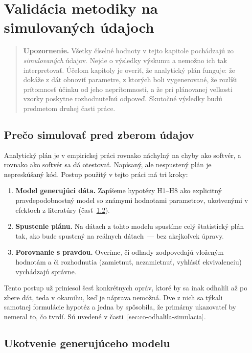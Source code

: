 \chapter{Validácia metodiky na simulovaných údajoch}
\label{chapter:vysledky}

\begin{quote}
\textbf{Upozornenie.} Všetky číselné hodnoty v tejto kapitole pochádzajú zo \emph{simulovaných} údajov. Nejde o výsledky výskumu a nemožno ich tak interpretovať. Účelom kapitoly je overiť, že analytický plán funguje: že dokáže z dát obnoviť parametre, z ktorých boli vygenerované, že rozlíši prítomnosť účinku od jeho neprítomnosti, a že pri plánovanej veľkosti vzorky poskytne rozhodnuteľnú odpoveď. Skutočné výsledky budú predmetom druhej časti práce.
\end{quote}

\section{Prečo simulovať pred zberom údajov}

Analytický plán je v empirickej práci rovnako náchylný na chyby ako softvér, a rovnako ako softvér sa dá otestovať. Napísaný, ale nespustený plán je nepreskúšaný kód. Postup použitý v tejto práci má tri kroky:

\begin{enumerate}[nosep]
    \item \textbf{Model generujúci dáta.} Zapíšeme hypotézy H1--H8 ako explicitný pravdepodobnostný model so známymi hodnotami parametrov, ukotvenými v efektoch z literatúry (časť~\ref{sec:dgp-kotvy}).
    \item \textbf{Spustenie plánu.} Na dátach z tohto modelu spustíme celý štatistický plán tak, ako bude spustený na reálnych dátach~--- bez akejkoľvek úpravy.
    \item \textbf{Porovnanie s pravdou.} Overíme, či odhady zodpovedajú vloženým hodnotám a či rozhodnutia (zamietnuť, nezamietnuť, vyhlásiť ekvivalenciu) vychádzajú správne.
\end{enumerate}

Tento postup už priniesol šesť konkrétnych opráv, ktoré by sa inak odhalili až po zbere dát, teda v okamihu, keď je náprava nemožná. Dve z nich sa týkali samotnej formulácie hypotéz a jedna by spôsobila, že primárny ukazovateľ by nemeral to, čo tvrdí. Sú uvedené v časti~\ref{sec:co-odhalila-simulacia}.

\section{Ukotvenie generujúceho modelu}
\label{sec:dgp-kotvy}

